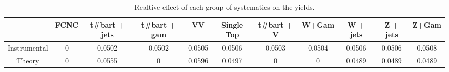 \begin{table}[htbp]
\begin{center}
\begin{tabular}{|c|c|c|c|c|c|c|c|c|c|c|}
\hline 
      & FCNC      & t#bar{t} + jets      & t#bar{t} +  gam      & VV      & Single Top      & t#bar{t} + V      & W+Gam      & W + jets      & Z + jets      & Z+Gam \\ 
\hline 
 Instrumental & 0 & 0.0502 & 0.0502 & 0.0505 & 0.0506 & 0.0503 & 0.0504 & 0.0506 & 0.0506 & 0.0508 \\ 
 Theory & 0 & 0.0555 & 0 & 0.0596 & 0.0497 & 0 & 0 & 0.0489 & 0.0489 & 0.0489 \\ 
\hline 
\end{tabular} 
\caption{Realtive effect of each group of systematics on the yields.} 
\end{center} 
\end{table} 

